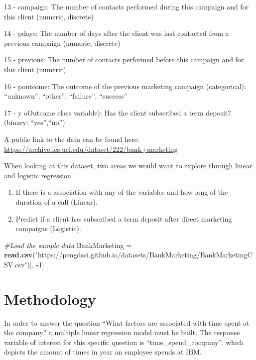 \documentclass[
]{article}
\newenvironment{Shaded}{\begin{snugshade}}{\end{snugshade}}
\newcommand{\CommentTok}[1]{\textcolor[rgb]{0.56,0.35,0.01}{\textit{#1}}}
\newcommand{\DecValTok}[1]{\textcolor[rgb]{0.00,0.00,0.81}{#1}}
\newcommand{\FunctionTok}[1]{\textcolor[rgb]{0.13,0.29,0.53}{\textbf{#1}}}
\newcommand{\NormalTok}[1]{#1}
\newcommand{\OtherTok}[1]{\textcolor[rgb]{0.56,0.35,0.01}{#1}}
\newcommand{\SpecialCharTok}[1]{\textcolor[rgb]{0.81,0.36,0.00}{\textbf{#1}}}
\newcommand{\StringTok}[1]{\textcolor[rgb]{0.31,0.60,0.02}{#1}}
\begin{document}
13 - campaign: The number of contacts performed during this campaign and
for this client (numeric, discrete)

14 - pdays: The number of days after the client was last contacted from
a previous campaign (numeric, discrete)

15 - previous: The number of contacts performed before this campaign and
for this client (numeric)

16 - poutcome: The outcome of the previous marketing campaign
(categorical): ``unknown'', ``other'', ``failure'', ``success''

17 - y oOutcome class variable): Has the client subscribed a term
deposit? (binary: ``yes'',``no'')

A public link to the data can be found here:
\url{https://archive.ics.uci.edu/dataset/222/bank+marketing}

When looking at this dataset, two areas we would want to explore through
linear and logistic regression.

\begin{enumerate}
\def\labelenumi{\arabic{enumi}.}
\item
  If there is a association with any of the variables and how long of
  the duration of a call (Linear).
\item
  Predict if a client has subscribed a term deposit after direct
  marketing campaigns (Logistic).
\end{enumerate}

\begin{Shaded}
\begin{Highlighting}[]
\CommentTok{\#Load the sample data}
\NormalTok{BankMarketing }\OtherTok{=} \FunctionTok{read.csv}\NormalTok{(}\StringTok{"https://pengdsci.github.io/datasets/BankMarketing/BankMarketingCSV.csv"}\NormalTok{)[, }\SpecialCharTok{{-}}\DecValTok{1}\NormalTok{]}
\end{Highlighting}
\end{Shaded}

\section{Methodology}\label{methodology}

In order to answer the question ``What factors are associated with time
spent at the company'' a multiple linear regression model must be built.
The response variable of interest for this specific question is
``time\_spend\_company'', which depicts the amount of times in year an
employee spends at IBM.
\end{document}
